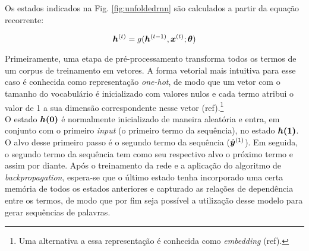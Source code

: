 %


Os estados indicados na Fig. \ref{fig:unfoldedrnn} são calculados a partir da equação recorrente:

\begin{equation}
\bm{h}^{(t)} = g(\bm{h}^{(t-1)}, \bm{x}^{(t)}; \bm{\theta})
\label{eq:rnn}
\end{equation}

Primeiramente, uma etapa de pré-processamento transforma todos os termos de um corpus de treinamento em vetores. A forma vetorial mais intuitiva para esse caso é conhecida como representação \textit{one-hot}, de modo que um vetor com o tamanho do vocabulário é inicializado com valores nulos e cada termo atribui o valor de 1 a sua dimensão correspondente nesse vetor (ref).\footnote{Uma alternativa a essa representação é conhecida como \textit{embedding} (ref).}\\
O estado $\bm{h(0)}$ é normalmente inicializado de maneira aleatória e entra, em conjunto com o primeiro \textit{input} (o primeiro termo da sequência), no estado $\bm{h(1)}$. O alvo desse primeiro passo é o segundo termo da sequência ($\hat{\bm{y}}^{(1)}$). Em seguida, o segundo termo da sequência tem como seu respectivo alvo o próximo termo e assim por diante. Após o treinamento da rede e a aplicação do algoritmo de \textit{backpropagation}, espera-se que o último estado tenha incorporado uma certa memória de todos os estados anteriores e capturado as relações de dependência entre os termos, de modo que por fim seja possível a utilização desse modelo para gerar sequências de palavras. 


